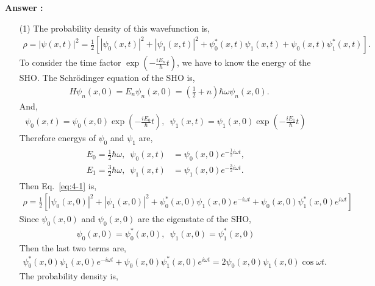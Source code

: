 \documentclass[floatfix,nofootinbib,superscriptaddress,fleqn]{revtex4-2}
\begin{document}
\noindent \textbf{Answer : }
\begin{itemize}
  \item[(1)] The probability density of this wavefunction is,
  \begin{align}\label{eq:4-1}
    \rho = |\psi(x,t)|^2 =\frac{1}{2}\left[
      |\psi_0(x,t)|^2+|\psi_1(x,t)|^2+\psi_0^*(x,t)
      \psi_1(x,t)+\psi_0(x,t)\psi_1^*(x,t)
    \right].
  \end{align}
  To consider the time factor $\exp{\left(-\frac{iE_n}{\hbar}t\right)}$, 
  we have to know the energy of the SHO.
  The Schr\"odinger equation of the SHO is,
  \begin{align}\label{eq:4-2}
      &H\psi_n(x,0)=E_n\psi_n(x,0)=\left(\frac{1}{2}+n\right)
      \hbar\omega\psi_n(x,0).
  \end{align}
  And,
  \begin{align*}%
    \psi_0(x,t) = \psi_0(x,0)\exp{\left(-\frac{iE_0}{\hbar}t\right)},\,\,\,
    \psi_1(x,t) = \psi_1(x,0)\exp{\left(-\frac{iE_1}{\hbar}t\right)}
  \end{align*}
  Therefore energys of $\psi_0$ and $\psi_1$ are,
  \begin{align}
    \begin{split}\label{eq:4-4}
      E_0 = \frac{1}{2}\hbar\omega,\,\,\,\psi_0(x,t)
      &=\psi_0(x,0)e^{-\frac{1}{2}i\omega t},  \\
      E_1 = \frac{3}{2}\hbar\omega,\,\,\,\psi_1(x,t)
      &=\psi_1(x,0)e^{-\frac{3}{2}i\omega t}.
    \end{split}
  \end{align}
  Then Eq.~\eqref{eq:4-1} is,
  \begin{align*}%
    \rho =\frac{1}{2}\left[
      |\psi_0(x,0)|^2+|\psi_1(x,0)|^2+\psi_0^*(x,0)\psi_1(x,0)e^{-i\omega t}
      +\psi_0(x,0)\psi_1^*(x,0)e^{i\omega t}
    \right]
  \end{align*}
  Since $\psi_0(x,0)$ and $\psi_0(x,0)$ are the eigenstate of the SHO,
  \begin{align}\label{eq:4-6}
    \psi_0(x,0)=\psi_0^*(x,0),\,\,\,\psi_1(x,0)=\psi_1^*(x,0)
  \end{align}
  Then the last two terms are,
  \begin{align*}%
    \psi_0^*(x,0)\psi_1(x,0)e^{-i\omega t}
      +\psi_0(x,0)\psi_1^*(x,0)e^{i\omega t}
      =2\psi_0(x,0)\psi_1(x,0)\cos{\omega t}.
  \end{align*}
  The probability density is,
  \begin{align}\label{eq:4-8}

\end{align}
\end{itemize}
\end{document}
